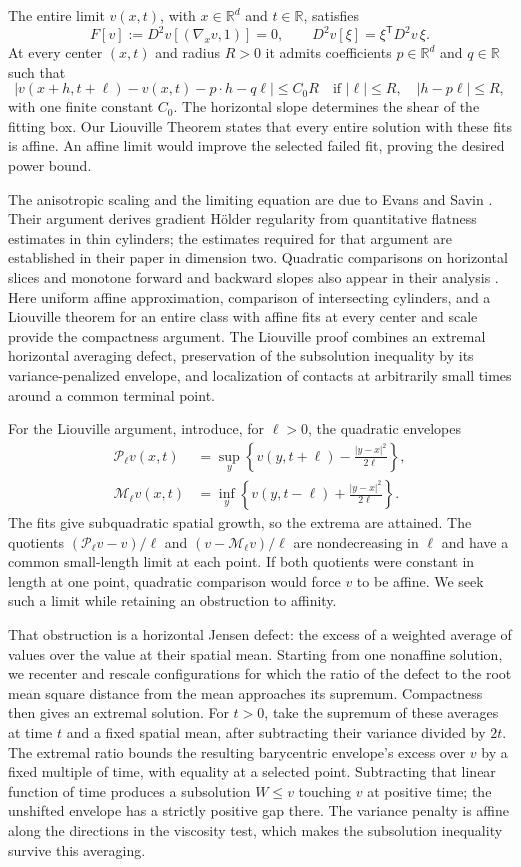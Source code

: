 \documentclass[11pt]{article}
\numberwithin{equation}{section}
\theoremstyle{definition}
\theoremstyle{remark}
\newcommand{\R}{\mathbb{R}}
\newcommand{\Penv}{\mathcal{P}}
\newcommand{\Menv}{\mathcal{M}}
\begin{document}
The entire limit $v(x,t)$, with $x\in\R^d$ and $t\in\R$, satisfies
\[
 F[v]:=D^2v[(\nabla_xv,1)]=0,
 \qquad D^2v[\xi]=\xi^{\mathsf T}D^2v\,\xi.
\]
At every center $(x,t)$ and radius $R>0$ it admits coefficients
$p\in\R^d$ and $q\in\R$ such that
\[
 |v(x+h,t+\ell)-v(x,t)-p\cdot h-q\ell|\le C_0R
 \quad\text{if } |\ell|\le R,\quad |h-p\ell|\le R,
\]
with one finite constant $C_0$. The horizontal slope determines the
shear of the fitting box. Our Liouville Theorem states that every entire
solution with these fits is affine. An affine limit would improve the
selected failed fit, proving the desired power bound.

The anisotropic scaling and the limiting equation are due to Evans and
Savin \cite[Sections~2.3--2.4]{EvansSavin2008}. Their argument derives
gradient H\"older regularity from quantitative flatness estimates in thin
cylinders; the estimates required for that argument are established in
their paper in dimension two. Quadratic comparisons on horizontal slices
and monotone forward and backward slopes also appear in their analysis
\cite[Section~3]{EvansSavin2008}. Here uniform affine approximation,
comparison of intersecting cylinders, and a Liouville theorem for an
entire class with affine fits at every center and scale provide the
compactness argument. The Liouville proof combines an extremal
horizontal averaging defect, preservation of the subsolution inequality
by its variance-penalized envelope, and localization of contacts at
arbitrarily small times around a common terminal point.

For the Liouville argument, introduce, for $\ell>0$, the quadratic envelopes
\begin{align*}
 \Penv_\ell v(x,t)
   &=\sup_y\left\{v(y,t+\ell)-\frac{|y-x|^2}{2\ell}\right\},
 \\
 \Menv_\ell v(x,t)
   &=\inf_y\left\{v(y,t-\ell)+\frac{|y-x|^2}{2\ell}\right\}.
\end{align*}
The fits give subquadratic spatial growth, so the extrema are attained.
The quotients $(\Penv_\ell v-v)/\ell$ and
$(v-\Menv_\ell v)/\ell$ are nondecreasing in $\ell$ and have a common
small-length limit at each point. If both quotients were constant in
length at one point, quadratic comparison would force $v$ to be affine.
We seek such a limit while retaining an obstruction to affinity.

That obstruction is a horizontal Jensen defect: the excess of a weighted
average of values over the value at their spatial mean. Starting from one
nonaffine solution, we recenter and rescale configurations for which the
ratio of the defect to the root mean square distance from the mean
approaches its supremum.
Compactness then gives an extremal solution. For $t>0$, take the supremum
of these averages at time $t$ and a fixed spatial mean, after subtracting
their variance divided by $2t$. The extremal ratio bounds the resulting
barycentric envelope's excess over $v$ by a fixed multiple of time, with
equality at a selected point. Subtracting that linear function of time produces a subsolution
$W\le v$ touching $v$ at positive time; the unshifted envelope has a
strictly positive gap there. The variance penalty is affine along the
directions in the viscosity test, which makes the subsolution inequality
survive this averaging.
\end{document}
